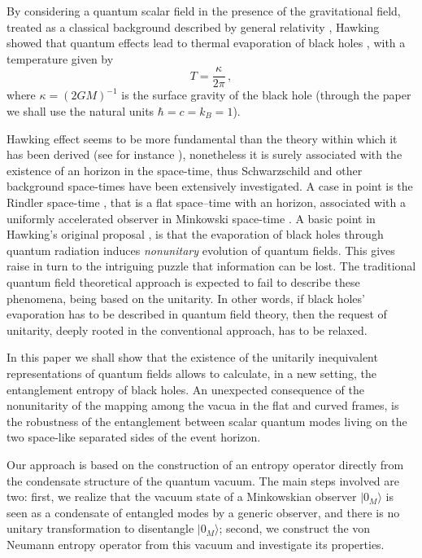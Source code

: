 \noindent By considering a quantum scalar field in the presence of
the gravitational field, treated as a classical background
described by general relativity \cite{birrell}, Hawking showed
that quantum effects lead to thermal evaporation of black holes
\cite{HAW}, with a temperature given by
\begin{equation}\label{1a}
T = \frac{\kappa}{2\pi}\,{,}
\end{equation}
where $\kappa = (2GM)^{-1}$ is the surface gravity of the black
hole (through the paper we shall use the natural units
$\hbar=c=k_B=1$).

\noindent Hawking effect seems to be more fundamental than the
theory within which it has been derived (see for instance
\cite{Bigatti:1999dp,Visser:2001kq}), nonetheless it is surely
associated with the existence of an horizon in the space-time,
thus Schwarzschild and other background space-times have been
extensively investigated. A case in point is the Rindler
space-time \cite{rindler}, that is a flat space--time with an
horizon, associated with a uniformly accelerated observer in
Minkowski space-time \cite{Davies:1974th,Unruh:db,TAK}. A basic
point in Hawking's original proposal \cite{HAW}, is that the
evaporation of black holes through quantum radiation induces {\it
nonunitary} evolution of quantum fields. This gives raise in turn
to the intriguing puzzle that information can be lost. The
traditional quantum field theoretical approach is expected to fail
to describe these phenomena, being based on the unitarity. In
other words, if black holes' evaporation has to be described in
quantum field theory, then the request of unitarity, deeply rooted
in the conventional approach, has to be relaxed.

\noindent In this paper we shall show that the existence of the
unitarily inequivalent representations of quantum fields allows to
calculate, in a new setting, the entanglement entropy of black
holes. An unexpected consequence of the nonunitarity of the
mapping among the vacua in the flat and curved frames, is the
robustness of the entanglement between scalar quantum modes living
on the two space-like separated sides of the event horizon.

\noindent Our approach is based on the construction of an entropy
operator directly from the condensate structure of the quantum
vacuum. The main steps involved are two: first, we realize that
the vacuum state of a Minkowskian observer $|0_M \rangle$ is seen
as a condensate of entangled modes by a generic observer, and
there is no unitary transformation to disentangle $|0_M \rangle$;
second, we construct the von Neumann entropy operator from this
vacuum and investigate its properties.

